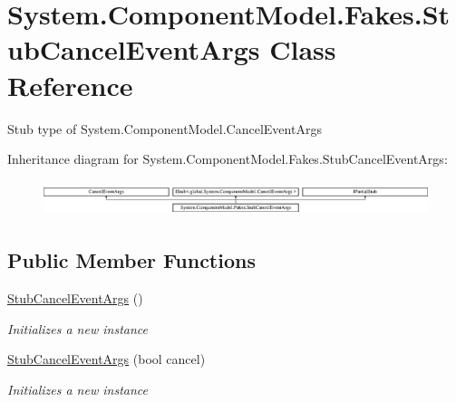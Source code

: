 \hypertarget{class_system_1_1_component_model_1_1_fakes_1_1_stub_cancel_event_args}{\section{System.\-Component\-Model.\-Fakes.\-Stub\-Cancel\-Event\-Args Class Reference}
\label{class_system_1_1_component_model_1_1_fakes_1_1_stub_cancel_event_args}
}


Stub type of System.\-Component\-Model.\-Cancel\-Event\-Args 


Inheritance diagram for System.\-Component\-Model.\-Fakes.\-Stub\-Cancel\-Event\-Args\-:\begin{figure}[H]
\begin{center}
\leavevmode
\includegraphics[height=1.051643cm]{class_system_1_1_component_model_1_1_fakes_1_1_stub_cancel_event_args}
\end{center}
\end{figure}
\subsection*{Public Member Functions}
\begin{DoxyCompactItemize}
\item 
\hyperlink{class_system_1_1_component_model_1_1_fakes_1_1_stub_cancel_event_args_a3e093556a326774479ad1ec9b7de8b76}{Stub\-Cancel\-Event\-Args} ()
\begin{DoxyCompactList}\small\item\em Initializes a new instance\end{DoxyCompactList}\item 
\hyperlink{class_system_1_1_component_model_1_1_fakes_1_1_stub_cancel_event_args_a0992387e3622af2adc411babc52a541b}{Stub\-Cancel\-Event\-Args} (bool cancel)
\begin{DoxyCompactList}\small\item\em Initializes a new instance\end{DoxyCompactList}\end{DoxyCompactItemize}

